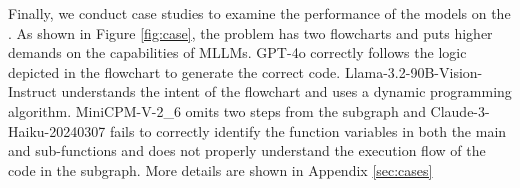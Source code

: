 Finally, we conduct case studies to examine the performance of the models on the \benchmark. As shown in Figure \ref{fig:case}, the problem has two flowcharts and puts higher demands on the capabilities of MLLMs. GPT-4o correctly follows the logic depicted in the flowchart to generate the correct code. Llama-3.2-90B-Vision-Instruct understands the intent of the flowchart and uses a dynamic programming algorithm. MiniCPM-V-2\_6 omits two steps from the subgraph and Claude-3-Haiku-20240307 fails to correctly identify the function variables in both the main and sub-functions and does not properly understand the execution flow of the code in the subgraph. More details are shown in Appendix \ref{sec:cases}




% 

